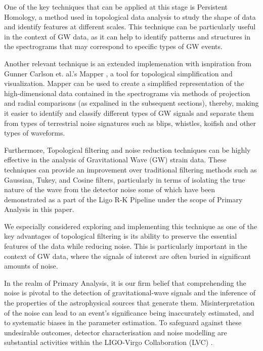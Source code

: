 One of the key techniques that can be applied at this stage is Persistent Homology, a method used in topological data analysis to study the shape of data and identify features at different scales. This technique can be particularly useful in the context of GW data, as it can help to identify patterns and structures in the spectrograms that may correspond to specific types of GW events. \cite{03.6_2015persistentHomo} \cite{06.1_carlsson2008persistentHomo} \cite{03.5_kramar2013persistenceComputing} \cite{03.3_de2007PersistentHomology}

Another relevant technique is an extended implemenation with isnpiration from Gunner Carlson et. al.'s Mapper \cite{01.9_2007MapperPBG}, a tool for topological simplification and visualization. Mapper can be used to create a simplified representation of the high-dimensional data contained in the spectrograms via methods of projection and radial comparisons (as expalined in the subsequent sections), thereby, making it easier to identify and classify different types of GW signals and separate them from types of terrestrial noise signatures such as blips, whistles, koifish and other types of waveforms. \cite{GravitySpy:online}

Furthermore, Topological filtering and noise reduction techniques can be highly effective in the analysis of Gravitational Wave (GW) strain data. These techniques can provide an improvement over traditional filtering methods such as Gaussian, Tukey, and Cosine filters, particularly in terms of isolating the true nature of the wave from the detector noise some of which have been demonstrated as a part of the Ligo R-K Pipeline under the scope of Primary Analysis in this paper.

We especially considered exploring and implementing this technique as one of the key advantages of topological filtering is its ability to preserve the essential features of the data while reducing noise. This is particularly important in the context of GW data, where the signals of interest are often buried in significant amounts of noise. \cite{02.3_2017introductionTDA} \cite{11.2_carlsson2020TDAMethods} \cite{13.0_2011topoMLNoise} \cite{12.1_2002topologicalInvariaceProjection}

In the realm of Primary Analysis, it is our firm belief that comprehending the noise is pivotal to the detection of gravitational-wave signals and the inference of the properties of the astrophysical sources that generate them. Misinterpretation of the noise can lead to an event's significance being inaccurately estimated, and to systematic biases in the parameter estimation. To safeguard against these undesirable outcomes, detector characterisation and noise modelling are substantial activities within the LIGO-Virgo Collaboration (LVC) \cite{00.5_GWDetectionNoiseCatalogue}.

